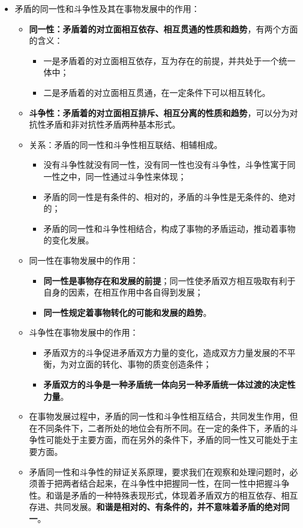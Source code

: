 \documentclass[12pt,openany]{ctexbook}
\newcommand{\zhemph}[1]{{\kaishu #1}}
\begin{document}
\begin{itemize}
  \item 矛盾的同一性和斗争性及其在事物发展中的作用：
\begin{itemize}
  \item \textbf{同一性：矛盾着的对立面相互依存、相互贯通的性质和趋势}，有两个方面的含义：
\begin{itemize}
  \item 一是矛盾着的对立面\zhemph{相互依存}，互为存在的前提，并共处于一个统一体中；
  \item 二是矛盾着的对立面相互贯通，在一定条件下可以\zhemph{相互转化}。
\end{itemize}
  \item \textbf{斗争性：矛盾着的对立面相互排斥、相互分离的性质和趋势}，可以分为对抗性矛盾和非对抗性矛盾两种基本形式。
  \item 关系：矛盾的同一性和斗争性相互联结、相辅相成。
\begin{itemize}
  \item 没有斗争性就没有同一性，没有同一性也没有斗争性，斗争性寓于同一性之中，同一性通过斗争性来体现；
  \item 矛盾的同一性是有条件的、相对的，矛盾的斗争性是无条件的、绝对的；
  \item 矛盾的同一性和斗争性相结合，构成了事物的矛盾运动，推动着事物的变化发展。
\end{itemize}
  \item 同一性在事物发展中的作用：
\begin{itemize}
  \item \textbf{同一性是事物存在和发展的前提}；同一性使矛盾双方相互吸取有利于自身的因素，在相互作用中各自得到发展；
  \item \textbf{同一性规定着事物转化的可能和发展的趋势}。
\end{itemize}
  \item 斗争性在事物发展中的作用：
\begin{itemize}
  \item 矛盾双方的斗争促进矛盾双方力量的变化，造成双方力量发展的不平衡，为对立面的转化、事物的质变创造条件；
  \item \textbf{矛盾双方的斗争是一种矛盾统一体向另一种矛盾统一体过渡的决定性力量}。
\end{itemize}
  \item 在事物发展过程中，矛盾的同一性和斗争性相互结合，共同发生作用，但在不同条件下，二者所处的地位会有所不同。在一定的条件下，矛盾的斗争性可能处于主要方面，而在另外的条件下，矛盾的同一性又可能处于主要方面。
  \item 矛盾同一性和斗争性的辩证关系原理，要求我们在观察和处理问题时，必须善于把两者结合起来，在斗争性中把握同一性，在同一性中把握斗争性。和谐是矛盾的一种特殊表现形式，体现着矛盾双方的相互依存、相互存进、共同发展。\textbf{和谐是相对的、有条件的，并不意味着矛盾的绝对同一}。

\end{itemize}
\end{itemize}
\end{document}
